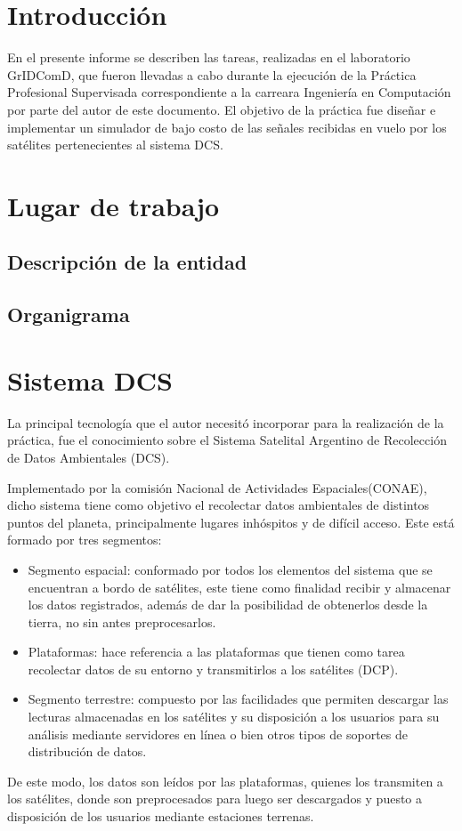 \documentclass[a4paper,10pt]{article}
\begin{document}
\tableofcontents

\pagebreak
\setcounter{page}{1}
\section{Introducción}
En el presente informe se describen las tareas, realizadas en el laboratorio
GrIDComD, que fueron llevadas a cabo durante la ejecución de la Práctica Profesional
Supervisada correspondiente a la carreara Ingeniería en Computación por parte del autor de
este documento. El objetivo de la práctica fue diseñar e implementar un simulador de bajo costo
de las señales recibidas en vuelo por los satélites pertenecientes al sistema DCS.

\section{Lugar de trabajo}
\subsection{Descripción de la entidad}
\subsection{Organigrama}

\section{Sistema DCS}

La principal tecnología que el autor necesitó incorporar para la realización de la práctica, fue el conocimiento
sobre el Sistema Satelital Argentino de Recolección de Datos Ambientales (DCS). 
\par
Implementado por la comisión Nacional de Actividades Espaciales(CONAE), dicho sistema tiene como objetivo el
recolectar datos ambientales de distintos puntos del planeta, principalmente lugares inhóspitos y de difícil acceso. Este está formado
por tres segmentos:

\begin{itemize}
\item Segmento espacial: conformado por todos los elementos del sistema que se encuentran a bordo de satélites, este tiene como finalidad
recibir y almacenar los datos registrados, además de dar la posibilidad de obtenerlos desde la tierra, no sin antes preprocesarlos.
\item Plataformas: hace referencia a las plataformas que tienen como tarea recolectar datos de su entorno y transmitirlos a los satélites (DCP).
\item Segmento terrestre: compuesto por las facilidades que permiten descargar las lecturas almacenadas en los satélites y su disposición
a los usuarios para su análisis mediante servidores en línea o bien otros tipos de soportes de distribución de datos.
\end{itemize}
De este modo, los datos son leídos por las plataformas, quienes los transmiten a los satélites, donde son preprocesados para luego ser descargados 
y puesto a disposición de los usuarios mediante estaciones terrenas.
\end{document}
